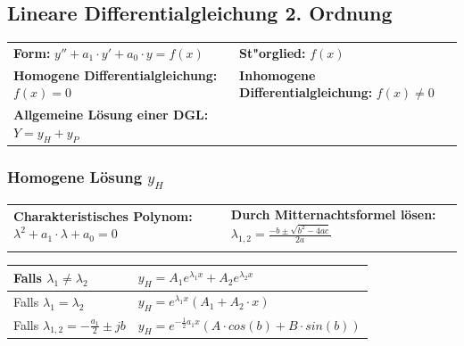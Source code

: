 \subsection{Lineare Differentialgleichung 2. Ordnung}
\renewcommand{\arraystretch}{1.2}
\begin{tabular}{p{8cm}p{8cm}}
	\textbf{Form:} $y''+a_1\cdot y'+a_0\cdot y=f(x)$  &
	\textbf{St"orglied:} $f(x)$\\
	\textbf{Homogene Differentialgleichung:} $f(x)=0$ &
	\textbf{Inhomogene Differentialgleichung:} $f(x)\neq 0$\\
	\textbf{Allgemeine Lösung einer DGL: }	$Y=y_H+y_P$& \\
\end{tabular}

\subsubsection{Homogene Lösung $y_H$}
\begin{tabular}{p{8cm}p{8cm}}
	\textbf{Charakteristisches Polynom:}\newline
	$\lambda^2+a_1\cdot\lambda+a_0=0$&	
	\textbf{Durch Mitternachtsformel lösen: }\newline
	$\lambda_{1,2}={\frac {-b\pm {\sqrt {b^{2}-4ac}}}{2a}}$\\\\
	
\end{tabular}

\begin{tabular}{|p{6cm}|p{8cm}|}
	\hline
	Falls $ \lambda_1\neq \lambda_2$&
	$y_H=A_1e^{\lambda_1x}+A_2e^{\lambda_2x}$\\
	\hline
	Falls $\lambda_1= \lambda_2$&
	$y_H=e^{\lambda_1x}(A_1+A_2\cdot x)$\\
	\hline
	Falls $\lambda_{1,2}= -\frac{a_1}{2} \pm jb$&
	$y_H=e^{-\frac{1}{2}a_1x}(A \cdot cos(b) +B \cdot sin(b))$\\
	\hline
\end{tabular}

